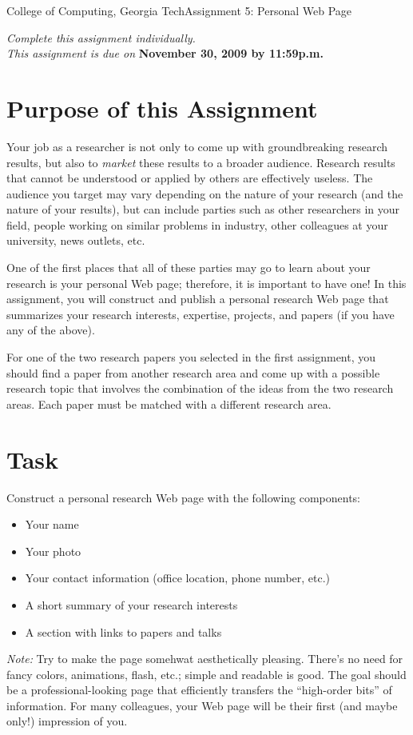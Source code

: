 \documentclass[11pt]{article}
\begin{document}


{College of Computing, Georgia Tech}{Assignment 5: Personal Web Page}

{\em Complete this assignment individually. \\  This
  assignment is due on} {\bf November 30, 2009 by 11:59p.m.}

\section{Purpose of this Assignment}


Your job as a researcher is not only to come up with groundbreaking
research results, but also to {\em market} these results to a broader
audience.  Research results that cannot be understood or applied by
others are effectively useless.  The audience you target may vary
depending on the nature of your research (and the nature of your
results), but can include parties such as other researchers in your
field, people working on similar problems in industry, other colleagues
at your university, news outlets, etc.

One of the first places that all of these parties may go to learn about
your research is your personal Web page; therefore, it is important to
have one!  In this assignment, you will construct and publish a personal
research Web page that summarizes your research interests, expertise,
projects, and papers (if you have any of the above). 



For one of the two research papers you selected in the first
assignment, you should find a paper from another research area and come
up with a possible research topic that involves the combination of the
ideas from the two research areas.  Each paper must be matched with a
different research area.


\section{Task}


Construct a personal research Web page with the following components:
\begin{itemize}
\item Your name
\item Your photo
\item Your contact information (office location, phone number, etc.)
\item A short summary of your research interests
\item A section with links to papers and talks
\end{itemize}
\noindent
{\em Note:} Try to make the page somehwat aesthetically pleasing.
There's no need for fancy colors, animations, flash, etc.; simple and
readable is good.  The goal should be a professional-looking page that
efficiently transfers the ``high-order bits'' of information.  For many
colleagues, your Web page will be their first (and maybe only!)
impression of you.
\end{document}
